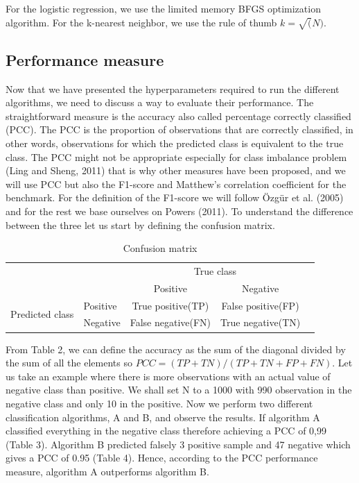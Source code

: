 \documentclass[a4paper,12pt]{article}
\numberwithin{equation}{section}
\begin{document}
For the logistic regression, we use the limited memory BFGS optimization algorithm. For the k-nearest neighbor, we use the rule of thumb $ k=\sqrt(N) $. 

\newpage
\subsection{Performance measure}

Now that we have presented the hyperparameters required to run the different algorithms, we need to discuss a way to evaluate their performance. The straightforward measure is the accuracy also called percentage correctly classified (PCC). The PCC is the proportion of observations that are correctly classified, in other words, observations for which the predicted class is equivalent to the true class. The PCC might not be appropriate especially for class imbalance problem (Ling and Sheng, 2011) that is why other measures have been proposed, and we will use PCC but also the F1-score and Matthew's correlation coefficient for the benchmark. For the definition of the F1-score we will follow {\"O}zg{\"u}r et al. (2005) and for the rest we base ourselves on Powers (2011).  To understand the difference between the three let us start by defining the confusion matrix.

\begin{table}[h]
\begin{center}
\caption{Confusion matrix}
\begin{tabular}{l|l|c|c|c}
\multicolumn{2}{c}{}&\multicolumn{2}{c}{True class}&\\
\cline{3-4}
\multicolumn{2}{c|}{}&Positive&Negative&\\
\cline{2-4}
\multirow{2}{*}{Predicted class}& Positive &  True positive(TP) & False positive(FP)& \\
\cline{2-4}
& Negative & False negative(FN) & True negative(TN) &\\
\cline{2-4}
\end{tabular}
\label{table:2}
\end{center}
\end{table}

From Table 2, we can define the accuracy as the sum of the diagonal divided by the sum of all the elements so $PCC = (TP+TN)/(TP+TN+FP+FN)$. Let us take an example where there is more observations with an actual value of negative class than positive. We shall set N to a 1000 with 990  observation in the negative class and only 10 in the positive. Now we perform two different classification algorithms, A and B, and observe the results. If algorithm A classified everything in the negative class therefore achieving a PCC of 0,99 (Table 3). Algorithm B predicted falsely 3 positive sample and 47 negative which gives a PCC of 0.95 (Table 4). Hence, according to the PCC performance measure, algorithm A outperforms algorithm B.
\end{document}
